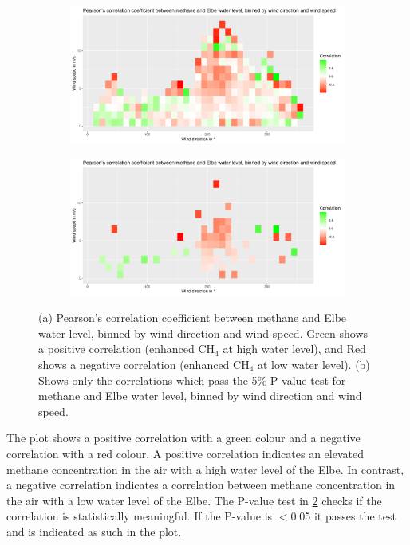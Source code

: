 \begin{figure}
\centering
\begin{subfigure}[b]{1\textwidth}
   \includegraphics[width=1\linewidth]{figures/Appendix/Water_Level/13_CH4_vs_Waterlevel_Correlation_Geomatikum.png}
   \caption{}
   \label{WaterLevelPCCGeomatikum} 
\end{subfigure}
\begin{subfigure}[b]{1\textwidth}
   \includegraphics[width=1\linewidth]{figures/Appendix/Water_Level/13_CH4_vs_Waterlevel_Correlation_P_value_Geomatikum.png}
   \caption{}
   \label{WaterLevelCorrPValueGeomatikum}
\end{subfigure}
\caption[Correlation between CH$_4$ and Water level]{(a) Pearson's correlation coefficient between methane and Elbe water level, binned by wind direction and wind speed. Green shows a positive correlation (enhanced CH$_4$ at high water level), and Red shows a negative correlation (enhanced CH$_4$ at low water level). (b) Shows only the correlations which pass the 5\% P-value test for methane and Elbe water level, binned by wind direction and wind speed.}
\label{WaterLevelCorrelationGeomatikum}
\end{figure}
The plot shows a positive correlation with a green colour and a negative correlation with a red colour. A positive correlation indicates an elevated methane concentration in the air with a high water level of the Elbe. In contrast, a negative correlation indicates a correlation between methane concentration in the air with a low water level of the Elbe. The P-value test in \cref{WaterLevelCorrPValueGeomatikum} checks if the correlation is statistically meaningful. If the P-value is $<$0.05 it passes the test and is indicated as such in the plot.\\
